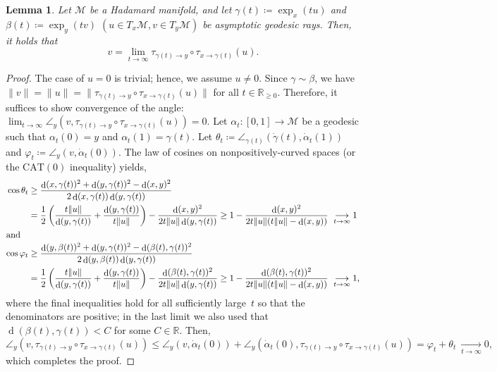 \documentclass[11pt,letterpaper]{article}
\newtheorem{lemma}[theorem]{Lemma}\AddToHook{env/lemma/begin}{\crefalias{theorem}{lemma}}
\numberwithin{equation}{section}
\newcommand{\RR}{\mathbb{R}}
\newcommand{\MM}{\mathcal{M}}
\DeclareMathOperator{\dist}{d}
\begin{document}
\begin{lemma}
    \label{lem:longdistanceparalleltransport}
    Let $\MM$ be a Hadamard manifold, and let $\gamma(t) \coloneqq \exp_x(tu)$ and $\beta(t) \coloneqq \exp_y(tv)$ $(u \in T_x\MM, v \in T_y\MM)$ be asymptotic geodesic rays.
    Then, it holds that
    \[
        v = \lim_{t \to \infty}\tau_{\gamma(t) \to y}\circ\tau_{x \to \gamma(t)}(u).
    \]
\end{lemma}
\begin{proof}
    The case of $u = 0$ is trivial; hence, we assume $u \neq 0$.
    Since $\gamma \sim \beta$, we have $\|v\| = \|u\| = \|\tau_{\gamma(t) \to y}\circ\tau_{x \to \gamma(t)}(u)\|$ for all $t \in \RR_{\ge 0}$.
    Therefore, it suffices to show convergence of the angle: $\lim_{t \to \infty}\angle_{y}(v, \tau_{\gamma(t) \to y}\circ\tau_{x \to \gamma(t)}(u)) = 0$.
    Let $\alpha_t: [0, 1] \to \MM$ be a geodesic such that $\alpha_t(0) = y$ and $\alpha_t(1) = \gamma(t)$.
    Let $\theta_t \coloneqq \angle_{\gamma(t)}(\dot\gamma(t), \dot\alpha_t(1))$ and $\varphi_t \coloneqq \angle_{y}(v, \dot\alpha_t(0))$.
    The law of cosines on nonpositively-curved spaces \cite[II.1.7~Proposition]{BridsonHaefliger1999} (or the $\mathrm{CAT}(0)$ inequality) yields,
    \begin{align*}
        \cos\theta_t
        &\ge \frac{\dist(x, \gamma(t))^2 + \dist(y, \gamma(t))^2 - \dist(x, y)^2}{2\dist(x, \gamma(t))\dist(y, \gamma(t))}\\
        &= \frac12\left(\frac{t\|u\|}{\dist(y, \gamma(t))} + \frac{\dist(y, \gamma(t))}{t\|u\|}\right) - \frac{\dist(x, y)^2}{2t\|u\|\dist(y, \gamma(t))} \ge 1 - \frac{\dist(x, y)^2}{2t\|u\|(t\|u\| - \dist(x, y))}\ \underset{t \to \infty}{\longrightarrow} 1 \\
    \intertext{and}
        \cos\varphi_t
        &\ge \frac{\dist(y, \beta(t))^2 + \dist(y, \gamma(t))^2 - \dist(\beta(t), \gamma(t))^2}{2\dist(y, \beta(t))\dist(y, \gamma(t))}\\
        &= \frac12\left(\frac{t\|u\|}{\dist(y, \gamma(t))} + \frac{\dist(y, \gamma(t))}{t\|u\|}\right) - \frac{\dist(\beta(t), \gamma(t))^2}{2t\|u\|\dist(y, \gamma(t))} \ge 1 - \frac{\dist(\beta(t), \gamma(t))^2}{2t\|u\|(t\|u\| - \dist(x, y))}\ \underset{t \to \infty}{\longrightarrow} 1,
    \end{align*}
    where the final inequalities hold for all sufficiently large~$t$ so that the denominators are positive;
    in the last limit we also used that $\dist(\beta(t), \gamma(t)) < C$ for some $C \in \RR$.
    Then,
    \[
        \angle_{y}(v, \tau_{\gamma(t) \to y}\circ\tau_{x \to \gamma(t)}(u)) \le \angle_{y}(v, \dot\alpha_t(0)) + \angle_y(\dot\alpha_t(0), \tau_{\gamma(t) \to y}\circ\tau_{x \to \gamma(t)}(u)) = \varphi_t + \theta_t\ \underset{t \to \infty}{\longrightarrow} 0,
    \]
    which completes the proof.
\end{proof}
\end{document}
